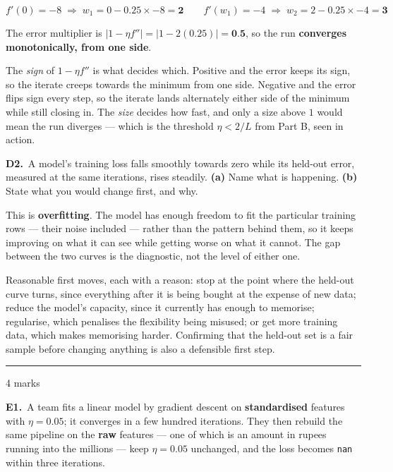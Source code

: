 \documentclass[10pt,a4paper]{article}
\newcommand{\parthead}[2]{\vspace{2pt}\noindent\rule{\linewidth}{0.4pt}\par\vspace{2pt}%
  \noindent{\bfseries Part #1}\hfill{\small #2}\par\vspace{1pt}}
\newcommand{\sol}[1]{\textbf{#1}}
\begin{document}
\[ f'(0) = -8 \;\Rightarrow\; w_1 = 0 - 0.25 \times -8 = \sol{2} \qquad f'(w_1) = -4 \;\Rightarrow\; w_2 = 2 - 0.25 \times -4 = \sol{3} \]

The error multiplier is $\lvert 1 - \eta f'' \rvert = \lvert 1 - 2(0.25) \rvert = \sol{0.5}$, so the run \sol{converges monotonically, from one side}.

\vspace{2pt}

The \emph{sign} of $1 - \eta f''$ is what decides which. Positive and the error keeps its sign, so the iterate creeps towards the minimum from one side. Negative and the error flips sign every step, so the iterate lands alternately either side of the minimum while still closing in. The \emph{size} decides how fast, and only a size above $1$ would mean the run diverges --- which is the threshold $\eta < 2/L$ from Part B, seen in action.

\vspace{6pt}

\textbf{D2.}\ A model's training loss falls smoothly towards zero while its held-out error, measured at the same iterations, rises steadily. \textbf{(a)} Name what is happening. \textbf{(b)} State what you would change first, and why.

\vspace{2pt}

This is \textbf{overfitting}. The model has enough freedom to fit the particular training rows --- their noise included --- rather than the pattern behind them, so it keeps improving on what it can see while getting worse on what it cannot. The gap between the two curves is the diagnostic, not the level of either one.\par\vspace{1mm}Reasonable first moves, each with a reason: stop at the point where the held-out curve turns, since everything after it is being bought at the expense of new data; reduce the model's capacity, since it currently has enough to memorise; regularise, which penalises the flexibility being misused; or get more training data, which makes memorising harder. Confirming that the held-out set is a fair sample before changing anything is also a defensible first step.

\newpage

\parthead{E --- Reasoning}{4 marks}

\textbf{E1.}\ A team fits a linear model by gradient descent on \textbf{standardised} features with $\eta = 0.05$;
it converges in a few hundred iterations. They then rebuild the same pipeline on the \textbf{raw} features
--- one of which is an amount in rupees running into the millions --- keep $\eta = 0.05$ unchanged, and the
loss becomes \texttt{nan} within three iterations.
\end{document}
